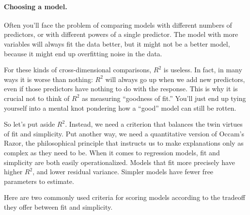 \documentclass[11pt]{article}
\newcommand{\1}[1]{\mathbf{1}_{\{ {#1} \}}}
\begin{document}
\paragraph{Choosing a model.}

Often you'll face the problem of comparing models with different numbers of predictors, or with different powers of a single predictor.  The model with more variables will always fit the data better, but it might not be a better model, because it might end up overfitting noise in the data.

For these kinds of cross-dimensional comparisons, $R^2$ is useless.  In fact, in many ways it is worse than nothing: $R^2$ will always go up when we add new predictors, even if those predictors have nothing to do with the response.  This is why it is crucial not to think of $R^2$ as measuring ``goodness of fit.''  You'll just end up tying yourself into a mental knot pondering how a ``good'' model can still be rotten.

So let's put aside $R^2$.  Instead, we need a criterion that balances the twin virtues of fit and simplicity.  Put another way, we need a quantitative version of Occam's Razor, the philosophical principle that instructs us to make explanations only as complex as they need to be.  When it comes to regression models, fit and simplicity are both easily operationalized.  Models that fit more precisely have higher $R^2$, and lower residual variance.  Simpler models have fewer free parameters to estimate.

Here are two commonly used criteria for scoring models according to the tradeoff they offer between fit and simplicity.
\end{document}
